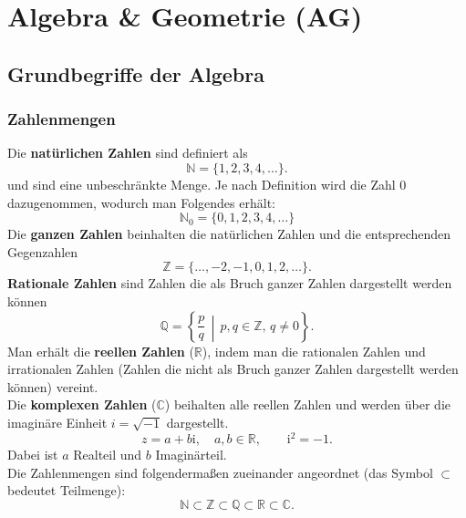 \section{Algebra \& Geometrie (AG)}
\subsection{Grundbegriffe der Algebra}
\subsubsection{Zahlenmengen}
\newcommand{\R}{\mathbb{R}}  
\newcommand{\N}{\mathbb{N}}  
\newcommand{\Q}{\mathbb{Q}}  
\newcommand{\Z}{\mathbb{Z}}  
\newcommand{\C}{\mathbb{C}}
\newcommand{\eps}{\varepsilon}
\newcommand{\veci}{\mathrm{i}} %
Die \textbf{natürlichen Zahlen} sind definiert als
\[
    \N = \{1,2,3,4,\dots\}.
\]
und sind eine unbeschränkte Menge. Je nach Definition wird die Zahl 0 dazugenommen, wodurch man Folgendes erhält:
\[
    \N_0 = \{0,1,2,3,4,\dots\}
\]
Die \textbf{ganzen Zahlen} beinhalten die natürlichen Zahlen und die entsprechenden Gegenzahlen
\[
    \Z = \{\dots,-2,-1,0,1,2,\dots\}.
\]
\textbf{Rationale Zahlen} sind Zahlen die als Bruch ganzer Zahlen dargestellt werden können
\[
    \Q=\left\{\frac{p}{q}\,\middle|\, p,q\in\Z,\, q\neq 0\right\}.
\]
Man erhält die \textbf{reellen Zahlen} (\(\R\)), indem man die rationalen Zahlen und irrationalen Zahlen (Zahlen die nicht als Bruch ganzer Zahlen dargestellt werden können) vereint. \\[5pt]
Die \textbf{komplexen Zahlen} (\(\C\)) beihalten alle reellen Zahlen und werden über die imaginäre Einheit \(i=\sqrt{-1}\) dargestellt.
\[
z=a+b\veci,\quad a,b\in\R,\qquad \veci^2=-1.
\]
Dabei ist \(a\) Realteil und \(b\) Imaginärteil. \\[5pt]
Die Zahlenmengen sind folgendermaßen zueinander angeordnet (das Symbol \(\subset\) bedeutet Teilmenge):
\[
\N \subset \Z \subset \Q \subset \R \subset \C.
\]

\begin{center}
\end{center}

